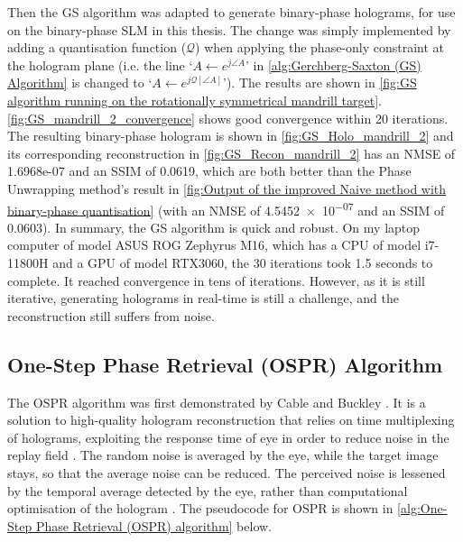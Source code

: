 Then the GS algorithm was adapted to generate binary-phase holograms, for use on the binary-phase SLM in this thesis. The change was simply implemented by adding a quantisation function ($\mathcal{Q}$) when applying the phase-only constraint at the hologram plane (i.e. the line `$A \gets e^{j\angle A}$' in \cref{alg:Gerchberg-Saxton (GS) Algorithm} is changed to `$A \gets e^{j\mathcal{Q}[\angle A]}$'). The results are shown in \cref{fig:GS algorithm running on the rotationally symmetrical mandrill target}. \cref{fig:GS_mandrill_2_convergence} shows good convergence within 20 iterations. The resulting binary-phase hologram is shown in \cref{fig:GS_Holo_mandrill_2} and its corresponding reconstruction in \cref{fig:GS_Recon_mandrill_2} has an NMSE of 1.6968e-07 and an SSIM of 0.0619, which are both better than the Phase Unwrapping method's result in \cref{fig:Output of the improved Naive method with binary-phase quantisation} (with an NMSE of \num{4.5452e-07} and an SSIM of 0.0603). In summary, the GS algorithm is quick and robust. On my laptop computer of model ASUS ROG Zephyrus M16, which has a CPU of model i7-11800H and a GPU of model RTX3060, the 30 iterations took 1.5 seconds to complete. It reached convergence in tens of iterations. However, as it is still iterative, generating holograms in real-time is still a challenge, and the reconstruction still suffers from noise.


\subsection{One-Step Phase Retrieval (OSPR) Algorithm}\label{sec:One Step Phase Retrieval (OSPR) Algorithm}
The OSPR algorithm was first demonstrated by Cable and Buckley \cite{Cable2004}. It is a solution to high-quality hologram reconstruction that relies on time multiplexing of holograms, exploiting the response time of eye in order to reduce noise in the replay field \cite{Cable2006}. The random noise is averaged by the eye, while the target image stays, so that the average noise can be reduced. The perceived noise is lessened by the temporal average detected by the eye, rather than computational optimisation of the hologram \cite{Cable2006}. The pseudocode for OSPR is shown in \cref{alg:One-Step Phase Retrieval (OSPR) algorithm} below.


